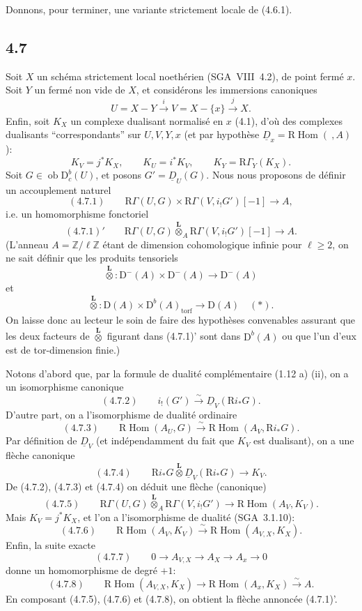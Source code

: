 \documentclass[11pt]{article}
\DeclareMathOperator{\Hom}{Hom}
\newcommand{\R}{\mathrm{R}}
\newcommand{\D}{\mathrm{D}}
\newcommand{\Z}{\mathbb{Z}}
\newcommand{\ob}{\operatorname{ob}}
\providecommand{\Hom}{\operatorname{Hom}}
\providecommand{\ob}{\operatorname{ob}}
\providecommand{\R}{\mathrm R}
\providecommand{\Z}{\mathbb Z}
\providecommand{\Hom}{\operatorname{Hom}}
\begin{document}
Donnons, pour terminer, une variante strictement locale de (4.6.1).

\subsection*{4.7}
Soit $X$ un schéma strictement local noethérien (SGA~VIII~4.2), de point fermé $x$. Soit $Y$ un fermé non vide de $X$, et considérons les immersions canoniques
\[
U=X-Y\xrightarrow{i}V=X-\{x\}\xrightarrow{j}X.
\]
Enfin, soit $K_X$ un complexe dualisant normalisé en $x$ (4.1), d'où des complexes dualisants ``correspondants'' sur $U,V,Y,x$ (et par hypothèse $\underline{D}_x=\R\Hom(\ ,A)$):
\[
K_V=j^*K_X,
\qquad K_U=i^*K_V,
\qquad K_Y=\R\Gamma_Y(K_X).
\]
Soit $G\in\ob\D_c^b(U)$, et posons $G'=\underline{D}_U(G)$. Nous nous proposons de définir un accouplement naturel
\[
(4.7.1)\qquad \R\Gamma(U,G)\times \R\Gamma(V,i_!G')[-1]\longrightarrow A,
\]
i.e. un homomorphisme fonctoriel
\[
(4.7.1)'\qquad \R\Gamma(U,G)\overset{\mathbf L}{\otimes}_A\R\Gamma(V,i_!G')[-1]\longrightarrow A.
\]
(L'anneau $A=\Z/\ell\Z$ étant de dimension cohomologique infinie pour $\ell\geqslant2$, on ne sait définir que les produits tensoriels
\[
\overset{\mathbf L}{\otimes}:\D^-(A)\times\D^-(A)\longrightarrow\D^-(A)
\]
et
\[
\overset{\mathbf L}{\otimes}:\D(A)\times\D^b(A)_{\mathrm{torf}}\longrightarrow\D(A)\quad(*).
\]
On laisse donc au lecteur le soin de faire des hypothèses convenables assurant que les deux facteurs de $\overset{\mathbf L}{\otimes}$ figurant dans (4.7.1)' sont dans $\D^b(A)$ ou que l'un d'eux est de tor-dimension finie.)

Notons d'abord que, par la formule de dualité complémentaire (1.12 a) (ii), on a un isomorphisme canonique
\[
(4.7.2)\qquad i_!(G')\xrightarrow{\sim}\underline{D}_V(\R i_*G).
\]
D'autre part, on a l'isomorphisme de dualité ordinaire
\[
(4.7.3)\qquad \R\Hom(A_U,G)\xrightarrow{\sim}\R\Hom(A_V,\R i_*G).
\]
Par définition de $\underline{D}_V$ (et indépendamment du fait que $K_V$ est dualisant), on a une flèche canonique
\[
(4.7.4)\qquad \R i_*G\overset{\mathbf L}{\otimes}\underline{D}_V(\R i_*G)\longrightarrow K_V.
\]
De (4.7.2), (4.7.3) et (4.7.4) on déduit une flèche (canonique)
\[
(4.7.5)\qquad \R\Gamma(U,G)\overset{\mathbf L}{\otimes}_A\R\Gamma(V,i_!G')\longrightarrow \R\Hom(A_V,K_V).
\]
Mais $K_V=j^*K_X$, et l'on a l'isomorphisme de dualité (SGA~3.1.10):
\[
(4.7.6)\qquad \R\Hom(A_V,K_V)\xrightarrow{\sim}\R\Hom(A_{V,X},K_X).
\]
Enfin, la suite exacte
\[
(4.7.7)\qquad 0\longrightarrow A_{V,X}\longrightarrow A_X\longrightarrow A_x\longrightarrow 0
\]
donne un homomorphisme de degré $+1$:
\[
(4.7.8)\qquad \R\Hom(A_{V,X},K_X)\longrightarrow \R\Hom(A_x,K_X)\xrightarrow{\sim}A.
\]
En composant (4.7.5), (4.7.6) et (4.7.8), on obtient la flèche annoncée (4.7.1)'.
\end{document}
